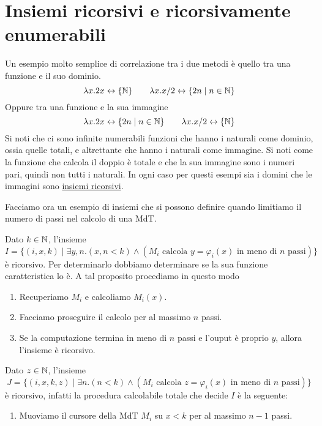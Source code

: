 \section{Insiemi ricorsivi e ricorsivamente enumerabili}
Un esempio molto semplice di correlazione tra i due metodi è
quello tra una funzione e il suo dominio.
\[
	\lambda x . 2 x \leftrightarrow \{ \mathbb{N} \} \qquad
	\lambda x . x / 2 \leftrightarrow \{ 2n \mid n \in \mathbb{N} \}
\]
Oppure tra una funzione e la sua immagine
\[
	\lambda x . 2 x \leftrightarrow \{ 2 n \mid n \in \mathbb{N} \}
	\qquad \lambda x . x / 2 \leftrightarrow \{ \mathbb{N} \}
\]
Si noti che ci sono infinite numerabili funzioni che hanno i
naturali come dominio, ossia quelle totali, e altrettante che
hanno i naturali come immagine. Si noti come la funzione che
calcola il doppio è totale e che la sua immagine sono i numeri
pari, quindi non tutti i naturali. In ogni caso per questi
esempi sia i domini che le immagini sono
\hyperref[def: relazione ricorsiva]{insiemi ricorsivi}.

Facciamo ora un esempio di insiemi che si possono definire
quando limitiamo il numero di passi nel calcolo di una MdT.

\begin{example}
	Dato $k \in \mathbb{N}$, l'insieme
	\[
		I = \{ (i, x, k) \mid \exists y, n . (x,n < k)
		\land (M_i \text{ calcola } y = \varphi_i (x)
		\text{ in meno di } n \text{ passi}) \}
	\]
	è ricorsivo. Per determinarlo dobbiamo determinare se la
	sua funzione caratteristica lo è. A tal proposito procediamo
	in questo modo
	\begin{enumerate}
		\item Recuperiamo $M_i$ e calcoliamo $M_i(x)$.
		\item Facciamo proseguire il calcolo per al massimo $n$
		      passi.
		\item Se la computazione termina in meno di $n$ passi
		      e l'ouput è proprio $y$, allora l'insieme è
		      ricorsivo.
	\end{enumerate}
\end{example}

\begin{example}
	Dato $z \in \mathbb{N}$, l'insieme
	\[
		J = \{ (i,x,k,z) \mid \exists n . (n < k)
		\land (M_i \text{ calcola } z = \varphi_i (x)
		\text{ in meno di } n \text{ passi}) \}
	\]
	è ricorsivo, infatti la procedura calcolabile
	totale che decide $I$ è la seguente:
	\begin{enumerate}
		\item Muoviamo il cursore della MdT $M_i$ su $x < k$
		      per al massimo $n-1$ passi.
	\end{enumerate}
\end{example}
